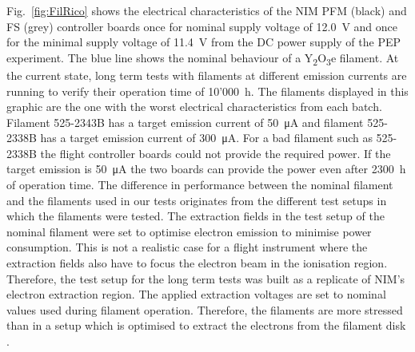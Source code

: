		Fig.~\ref{fig:FilRico} shows the electrical characteristics of the NIM PFM (black) and FS (grey) controller boards once for nominal supply voltage of 12.0~V and once for the minimal supply voltage of 11.4~V from the DC power supply of the PEP experiment. The blue line shows the nominal behaviour of a Y\textsubscript{2}O\textsubscript{3}e filament. At the current state, long term tests with filaments at different emission currents are running to verify their operation time of 10'000~h. The filaments displayed in this graphic are the one with the worst electrical characteristics from each batch. Filament 525-2343B has a target emission current of 50~\si{\micro\ampere} and filament 525-2338B has a target emission current of 300~\si{\micro\ampere}. For a bad filament such as 525-2338B the flight controller boards could not provide the required power. If the target emission is 50~\si{\micro\ampere} the two boards can provide the power even after 2300~h of operation time. The difference in performance between the nominal filament and the filaments used in our tests originates from the different test setups in which the filaments were tested. The extraction fields in the test setup of the nominal filament were set to optimise electron emission to minimise power consumption. This is not a realistic case for a flight instrument where the extraction fields also have to focus the electron beam in the ionisation region. Therefore, the test setup for the long term tests was built as a replicate of NIM's electron extraction region. The applied extraction voltages are set to nominal values used during filament operation. Therefore, the filaments are more stressed than in a setup which is optimised to extract the electrons from the filament disk \cite{Diss_Fausch}.
		
		
